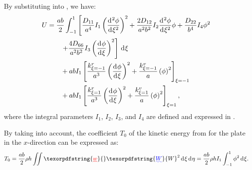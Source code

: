 \documentclass[preprint,12pt,number]{elsarticle}
\newcommand{\id}{\mathrm{d}\mkern1mu}
\providecommand{\DIFaddtex}[1]{{\protect\color{blue}\uwave{#1}}} %
\providecommand{\DIFdeltex}[1]{{\protect\color{red}\sout{#1}}}                      %
\providecommand{\DIFaddbegin}{} %
\providecommand{\DIFaddend}{} %
\providecommand{\DIFdelbegin}{} %
\providecommand{\DIFdelend}{} %
\providecommand{\DIFadd}[1]{\texorpdfstring{\DIFaddtex{#1}}{#1}} %
\providecommand{\DIFdel}[1]{\texorpdfstring{\DIFdeltex{#1}}{}} %
\newcommand{\DIFscaledelfig}{0.5}
\newlength{\DIFdelgraphicswidth} %
\newlength{\DIFdelgraphicsheight} %
\newcommand{\DIFaddincludegraphics}[2][]{{\color{blue}\fbox{\DIFOincludegraphics[#1]{#2}}}} %
\newcommand{\DIFdelincludegraphics}[2][]{%
\sbox{\DIFdelgraphicsbox}{\DIFOincludegraphics[#1]{#2}}%
\settoboxwidth{\DIFdelgraphicswidth}{\DIFdelgraphicsbox} %
\settoboxtotalheight{\DIFdelgraphicsheight}{\DIFdelgraphicsbox} %
\scalebox{\DIFscaledelfig}{%
\parbox[b]{\DIFdelgraphicswidth}{\usebox{\DIFdelgraphicsbox}\\[-\baselineskip] \rule{\DIFdelgraphicswidth}{0em}}\llap{\resizebox{\DIFdelgraphicswidth}{\DIFdelgraphicsheight}{%
\setlength{\unitlength}{\DIFdelgraphicswidth}%
\begin{picture}(1,1)%
\thicklines\linethickness{2pt} %
{\color[rgb]{1,0,0}\put(0,0){\framebox(1,1){}}}%
{\color[rgb]{1,0,0}\put(0,0){\line( 1,1){1}}}%
{\color[rgb]{1,0,0}\put(0,1){\line(1,-1){1}}}%
\end{picture}%
}\hspace*{3pt}}} %
} %
\DeclareRobustCommand{\DIFaddbegin}{\DIFOaddbegin \let\includegraphics\DIFaddincludegraphics} %
\DeclareRobustCommand{\DIFaddend}{\DIFOaddend \let\includegraphics\DIFOincludegraphics} %
\DeclareRobustCommand{\DIFdelbegin}{\DIFOdelbegin \let\includegraphics\DIFdelincludegraphics} %
\DeclareRobustCommand{\DIFdelend}{\DIFOaddend \let\includegraphics\DIFOincludegraphics} %
\begin{document}
%
By substituting  into , we have:
%
\begin{equation}\label{eq:poten_energy_tolx2}
\begin{split}
	U&=\frac{ab}{2} \int_{-1}^{1} \left[ \frac{D_{11}}{a^4}I_1 \left( \frac{\id^2\phi }{\id \xi^2} \right)^2 + \frac{2 D_{12}}{a^2 b^2}I_2 \frac{\id^2\phi }{\id \xi^2}\phi  + \frac{D_{22}}{b^4}I_4  \phi^2 \right. \\
	&\qquad \left. + \frac{4 D_{66}}{a^2 b^2}I_3 \left( \frac{\id \phi }{\id \xi}\right)^2 \right] \, \id\xi \\
	&\qquad + abI_1 \left[\frac{k^r_{\xi=-1}}{a^3} \left( \frac{\id \phi}{\id \xi} \right)^2+ \frac{k^v_{\xi=-1}}{a} \left( \phi \right)^2\right]_{\xi=-1}\\
	&\qquad + abI_1 \left[\frac{k^r_{\xi=1}}{a^3} \left( \frac{\id \phi}{\id \xi} \right)^2+ \frac{k^v_{\xi=1}}{a} \left( \phi \right)^2\right]_{\xi=1},
\end{split}
\end{equation}
%
where the integral parameters $I_1$, $I_2$, $I_3$, and $ I_4$ are defined and expressed in .


By taking  into account, the coefficient $T_0$ of the kinetic energy from  for the plate in the $x$-direction can be expressed as:
%
\begin{equation}\label{eq:kine_energyx}
\begin{split}
	T_0 = \frac{ab}{2}\rho h\iint \DIFdelbegin \DIFdel{w}\DIFdelend \DIFaddbegin \DIFadd{W}\DIFaddend ^2 \, \id \xi \, \id \eta = \frac{ab}{2}\rho h I_1\int_{-1}^{1} \phi^2 \, \id \xi.
\end{split}
\end{equation}
\end{document}
